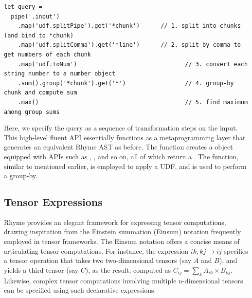 \documentclass[runningheads]{llncs}
\newcommand{\lang}{Rhyme}
\begin{document}
\begin{lstlisting}[style=JavaScript, columns=flexible]
let query =
  pipe('.input')
    .map('udf.splitPipe').get('*chunk')      // 1. split into chunks (and bind to *chunk)
    .map('udf.splitComma').get('*line')      // 2. split by comma to get numbers of each chunk
    .map('udf.toNum')                               // 3. convert each string number to a number object
    .sum().group('*chunk').get('*')                 // 4. group-by chunk and compute sum
    .max()                                          // 5. find maximum among group sums
\end{lstlisting}

Here, we specify the query as a sequence of transformation steps on the input.
This high-level fluent API essentially functions as a metaprogramming layer
that generates an equivalent \lang{} AST as before.
The  function creates a  object equipped with
APIs such as , , and so on, all of which return a
.
The  function, similar to  mentioned earlier,
is employed to apply a UDF, and  is used to perform a group-by.



\subsection{Tensor Expressions}\label{subsec:tensor}

\lang{} provides an elegant framework for expressing tensor computations,
drawing inspiration from the Einstein summation (Einsum) notation frequently
employed in tensor frameworks.
The Einsum notation offers a concise means of articulating tensor computations.
For instance, the expression $ik,kj \rightarrow ij$ specifies a tensor operation
that takes two two-dimensional tensors (say $A$ and $B$), and yields a third
tensor (say $C$), as the result, computed as $C_{ij} = \sum_k A_{ik} \times B_{kj}$.
Likewise, complex tensor computations involving multiple n-dimensional tensors can
be specified using such declarative expressions.
\end{document}
